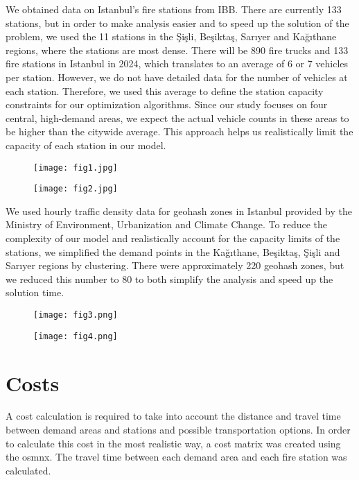 \documentclass[conference]{IEEEtran}
\begin{document}
We obtained data on Istanbul's fire stations from IBB. There are currently 133 stations, but in order to make analysis easier and to speed up the solution of the problem, we used the 11 stations in the Şişli, Beşiktaş, Sarıyer and Kağıthane regions, where the stations are most dense. There will be 890 fire trucks and 133 fire stations in Istanbul in 2024, which translates to an average of 6 or 7 vehicles per station. However, we do not have detailed data for the number of vehicles at each station. Therefore, we used this average to define the station capacity constraints for our optimization algorithms. Since our study focuses on four central, high-demand areas, we expect the actual vehicle counts in these areas to be higher than the citywide average. This approach helps us realistically limit the capacity of each station in our model.

\begin{figure}[H] 
    \centering
    \texttt{[image: fig1.jpg]} 
\end{figure}

\begin{figure}[H] 
    \centering
    \texttt{[image: fig2.jpg]}
\end{figure}

We used hourly traffic density data for geohash zones in Istanbul provided by the Ministry of Environment, Urbanization and Climate Change. To reduce the complexity of our model and realistically account for the capacity limits of the stations, we simplified the demand points in the Kağıthane, Beşiktaş, Şişli and Sarıyer regions by clustering. There were approximately 220 geohash zones, but we reduced this number to 80 to both simplify the analysis and speed up the solution time.

\begin{figure}[H] 
    \centering
    \texttt{[image: fig3.png]}
\end{figure}

\begin{figure}[H] 
    \centering
    \texttt{[image: fig4.png]}
\end{figure}


\section*{\textbf{Costs}}

A cost calculation is required to take into account the distance and travel time between demand areas and stations and possible transportation options. In order to calculate this cost in the most realistic way, a cost matrix was created using the osmnx. The travel time between each demand area and each fire station was calculated.
\end{document}

